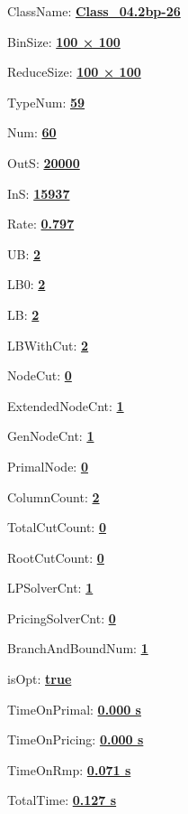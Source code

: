 \documentclass[11pt]{article}
\begin{document}
\pagestyle{empty}


ClassName: \underline{\textbf{Class_04.2bp-26}}
\par
BinSize: \underline{\textbf{100 × 100}}
\par
ReduceSize: \underline{\textbf{100 × 100}}
\par
TypeNum: \underline{\textbf{59}}
\par
Num: \underline{\textbf{60}}
\par
OutS: \underline{\textbf{20000}}
\par
InS: \underline{\textbf{15937}}
\par
Rate: \underline{\textbf{0.797}}
\par
UB: \underline{\textbf{2}}
\par
LB0: \underline{\textbf{2}}
\par
LB: \underline{\textbf{2}}
\par
LBWithCut: \underline{\textbf{2}}
\par
NodeCut: \underline{\textbf{0}}
\par
ExtendedNodeCnt: \underline{\textbf{1}}
\par
GenNodeCnt: \underline{\textbf{1}}
\par
PrimalNode: \underline{\textbf{0}}
\par
ColumnCount: \underline{\textbf{2}}
\par
TotalCutCount: \underline{\textbf{0}}
\par
RootCutCount: \underline{\textbf{0}}
\par
LPSolverCnt: \underline{\textbf{1}}
\par
PricingSolverCnt: \underline{\textbf{0}}
\par
BranchAndBoundNum: \underline{\textbf{1}}
\par
isOpt: \underline{\textbf{true}}
\par
TimeOnPrimal: \underline{\textbf{0.000 s}}
\par
TimeOnPricing: \underline{\textbf{0.000 s}}
\par
TimeOnRmp: \underline{\textbf{0.071 s}}
\par
TotalTime: \underline{\textbf{0.127 s}}
\par
\newpage
\end{document}
